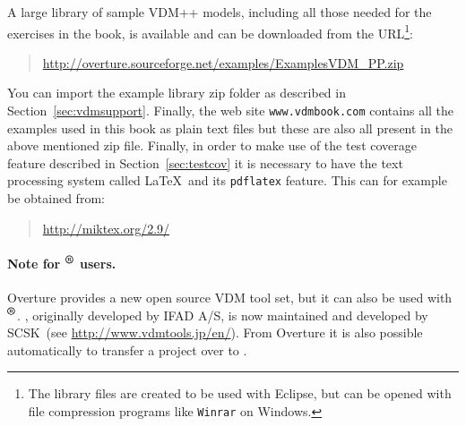 \begin{description}

\end{description}

A large library of sample VDM++ models, including all those needed
for the exercises in the book, is available and can be downloaded from
the
URL\footnote{The library files are created to be used with Eclipse,
  but can be opened with file compression programs like \texttt{Winrar} on
  Windows.}:
\begin{quote}
\url{http://overture.sourceforge.net/examples/ExamplesVDM_PP.zip}
\end{quote}
You can import the example library zip folder as described in
Section~\ref{sec:vdmsupport}.  Finally, the web site
\texttt{www.vdmbook.com} contains all the examples used in this book
as plain text files but these are also all present in the above
mentioned zip file. Finally, in order to make use of the
test coverage feature described in Section~\ref{sec:testcov} it is
necessary to have the text processing system called \LaTeX\ and its
\texttt{pdflatex} feature. This can for example be obtained from:
\begin{quote}
\url{http://miktex.org/2.9/}
\end{quote}


\paragraph{Note for \vdmtools$^{\mbox{\small\textbf{{\textregistered}}}}$ users.}
Overture provides a new open source VDM tool set, but it can
also be used with
\vdmtools$^{\mbox{\small\textbf{{\textregistered}}}}$. \vdmtools, originally developed by IFAD A/S, is now
maintained and developed by SCSK~(see
\url{http://www.vdmtools.jp/en/}). From Overture it is also possible
automatically to transfer a project over to \vdmtools.

